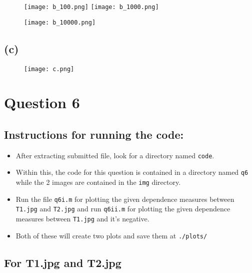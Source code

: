 \documentclass[11pt, fleqn]{article}
\begin{document}
\begin{figure}[H]
    \centering
    \begin{floatrow}
        \ffigbox[0.4\textwidth]{}
        {\texttt{[image: b\_100.png]}}
        \ffigbox[0.4\textwidth]{}
        {\texttt{[image: b\_1000.png]}}
    \end{floatrow}
    \vspace{1em}
    \begin{floatrow}
        \ffigbox[0.4\textwidth]{}
        {\texttt{[image: b\_10000.png]}}
    \end{floatrow}
\end{figure}

\subsection*{(c)}
\begin{figure}[H]
    \centering
    \texttt{[image: c.png]}
\end{figure}



\newpage
\section*{Question 6}
\setcounter{equation}{0}

\subsection*{Instructions for running the code:}
\begin{itemize}
    \item After extracting submitted file, look for a directory named \texttt{code}. 
    \item Within this, the code for this question is contained in a directory named \texttt{q6} while the 2 images are contained in the \texttt{img} directory.
    \item Run the file \texttt{q6i.m} for plotting the given dependence measures between \texttt{T1.jpg} and \texttt{T2.jpg} and run \texttt{q6ii.m} for plotting the given dependence measures between \texttt{T1.jpg} and it's negative. 
    \item Both of these will create two plots and save them at \texttt{./plots/}
\end{itemize}
\vspace{-1em}
\subsection*{\Large For T1.jpg and T2.jpg}
\end{document}
